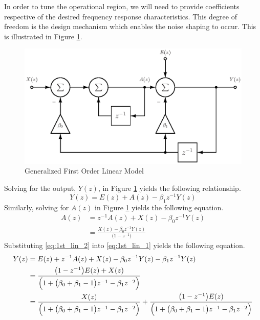In order to tune the operational region, we will need to provide coefficients respective
of the desired frequency response characteristics. This degree of freedom is the design
mechanism which enables the noise shaping to occur. This is illustrated in Figure
\ref{fig:linear_z_model_2}.
\begin{figure}[htbp]
 \centering
 \includegraphics{./final_figures/first_order_linear_model.eps}
 \caption{Generalized First Order Linear Model}
 \label{fig:linear_z_model_2}
\end{figure}
Solving for the output, $Y(z)$, in Figure \ref{fig:linear_z_model_2} yields the
following relationship.
\begin{equation}\label{eq:1st_lin_1}
 Y(z)=E(z)+A(z)-\beta_{1}z^{-1}Y(z)
\end{equation}
Similarly, solving for $A(z)$ in Figure \ref{fig:linear_z_model_2} yields the following
equation.
\begin{equation}\label{eq:1st_lin_2}
 \begin{split}
 A(z) &= z^{-1}A(z)+X(z)-\beta_{0}z^{-1}Y(z)\\
      &= \frac{X(z)-\beta_{0}z^{-1}Y(z)}{\bigl(1-z^{-1}\bigr)}
 \end{split}
\end{equation}
Substituting \eqref{eq:1st_lin_2} into \eqref{eq:1st_lin_1} yields the following
equation.
\begin{equation}\label{eq:1st_lin_3}
  \begin{split}
  Y(z) &= E(z)+z^{-1}A(z)+X(z)-\beta_{0}z^{-1}Y(z)-\beta_{1}z^{-1}Y(z)\\
      &=
\frac{\bigl(1-z^{-1}\bigr)E(z)+X(z)}{\Bigl(1+\bigl(\beta_{0}+\beta_{1}-1\bigr)z^{-1}
-\beta_{1}z^{-2}\Bigr)}\\
     &= \frac{X(z)}{\Bigl(1+\bigl(\beta_{0}+\beta_{1}-1\bigr)z^
 {-1}-\beta_{1}z^{-2}\Bigr)}+\frac{\bigl(1-z^{-1}\bigr)E(z)}{\Bigl(1+\bigl(\beta_{0}
 +\beta_{1}-1\bigr)z^{-1}-\beta_{1}z^{-2}\Bigr)}
 \end{split}
\end{equation}
